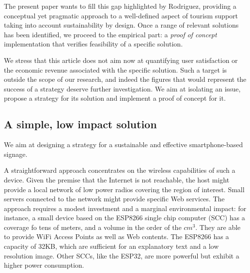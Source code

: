 \documentclass[sustainability,article,submit,pdftex,moreauthors]{Definitions/mdpi}
\begin{document}
The present paper wants to fill this gap highlighted by Rodriguez, providing a conceptual yet pragmatic approach to a well-defined aspect of tourism support taking into account sustainability by design. Once a range of relevant solutions has been identified, we proceed to the empirical part: a {\em proof of concept} implementation that verifies feasibility of a specific solution.

We stress that this article does not aim now at quantifying user satisfaction or the economic revenue associated with the specific solution. Such a target is outside the scope of our research, and indeed the figures that would represent the success of a strategy deserve further investigation. We aim at isolating an issue, propose a strategy for its solution and implement a proof of concept for it.





\subsection{A simple, low impact solution}


We aim at designing a strategy for a sustainable and effective smartphone-based signage.

A straightforward approach concentrates on the wireless capabilities of such a device. Given the premise that the Internet is not reachable, the host might provide a local network of low power radios covering the region of interest. Small servers connected to the network might provide specific Web services. The approach requires a modest investment and a marginal environmental impact: for instance, a small device based on the ESP8266 single chip computer (SCC) has a coverage fo tens of meters, and a volume in the order of the $cm^3$. They are able to provide WiFi Access Points as well as Web contents. The ESP8266 has a capacity of 32KB, which are sufficient for an explanatory text and a low resolution image. Other SCCs, like the ESP32, are more powerful but exhibit a higher power consumption. 
\end{document}
